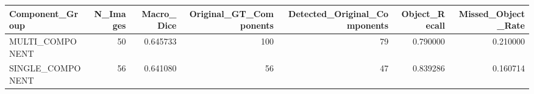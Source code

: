 \begin{tabular}{lrrrrrr}
\toprule
Component_Group & N_Images & Macro_Dice & Original_GT_Components & Detected_Original_Components & Object_Recall & Missed_Object_Rate \\
\midrule
MULTI_COMPONENT & 50 & 0.645733 & 100 & 79 & 0.790000 & 0.210000 \\
SINGLE_COMPONENT & 56 & 0.641080 & 56 & 47 & 0.839286 & 0.160714 \\
\bottomrule
\end{tabular}
